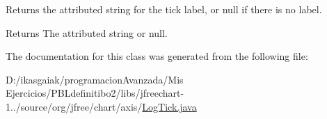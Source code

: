 Returns the attributed string for the tick label, or {\ttfamily null} if there is no label.

\begin{DoxyReturn}{Returns}
The attributed string or {\ttfamily null}. 
\end{DoxyReturn}


The documentation for this class was generated from the following file\+:\begin{DoxyCompactItemize}
\item 
D\+:/ikasgaiak/programacion\+Avanzada/\+Mis Ejercicios/\+P\+B\+Ldefinitibo2/libs/jfreechart-\/1../source/org/jfree/chart/axis/\mbox{\hyperlink{_log_tick_8java}{Log\+Tick.\+java}}\end{DoxyCompactItemize}
